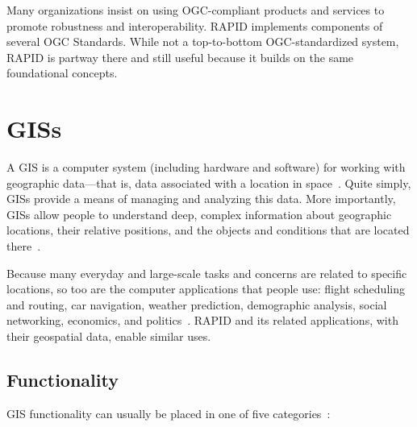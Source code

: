 Many organizations insist on using OGC-compliant products and services to promote robustness and interoperability. RAPID implements components of several OGC Standards. While not a top-to-bottom OGC-standardized system, RAPID is partway there and still useful because it builds on the same foundational concepts.

\section{GISs}
A GIS is a computer system (including hardware and software) for working with geographic data---that is, data associated with a location in space~\cite{Esriintro}. Quite simply, GISs provide a means of managing and analyzing this data. More importantly, GISs allow people to understand deep, complex information about geographic locations, their relative positions, and the objects and conditions that are located there~\cite{Esriintro}.

Because many everyday and large-scale tasks and concerns are related to specific locations, so too are the computer applications that people use: flight scheduling and routing, car navigation, weather prediction, demographic analysis, social networking, economics, and politics~\cite{Esriintro}. RAPID and its related applications, with their geospatial data, enable similar uses.

\subsection{Functionality}
GIS functionality can usually be placed in one of five categories~\cite{Esriintro}:

